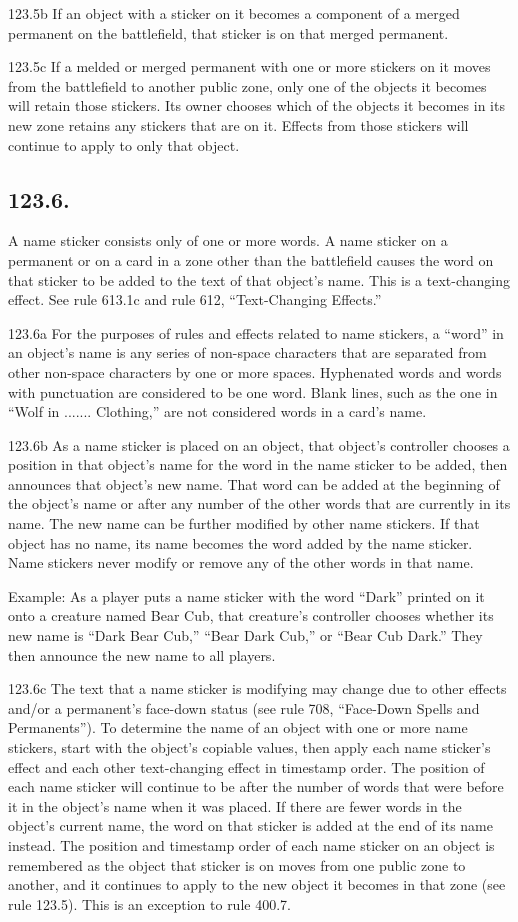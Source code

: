 123.5b If an object with a sticker on it becomes a component of a merged permanent on the battlefield, that sticker is on that merged permanent.

123.5c If a melded or merged permanent with one or more stickers on it moves from the battlefield to another public zone, only one of the objects it becomes will retain those stickers. Its owner chooses which of the objects it becomes in its new zone retains any stickers that are on it. Effects from those stickers will continue to apply to only that object.

\subsection*{123.6.}
A name sticker consists only of one or more words. A name sticker on a permanent or on a card in a zone other than the battlefield causes the word on that sticker to be added to the text of that object’s name. This is a text-changing effect. See rule 613.1c and rule 612, “Text-Changing Effects.”

123.6a For the purposes of rules and effects related to name stickers, a “word” in an object’s name is any series of non-space characters that are separated from other non-space characters by one or more spaces. Hyphenated words and words with punctuation are considered to be one word. Blank lines, such as the one in “Wolf in ....... Clothing,” are not considered words in a card’s name.

123.6b As a name sticker is placed on an object, that object’s controller chooses a position in that object’s name for the word in the name sticker to be added, then announces that object’s new name. That word can be added at the beginning of the object’s name or after any number of the other words that are currently in its name. The new name can be further modified by other name stickers. If that object has no name, its name becomes the word added by the name sticker. Name stickers never modify or remove any of the other words in that name.

Example: As a player puts a name sticker with the word “Dark” printed on it onto a creature named Bear Cub, that creature’s controller chooses whether its new name is “Dark Bear Cub,” “Bear Dark Cub,” or “Bear Cub Dark.” They then announce the new name to all players.

123.6c The text that a name sticker is modifying may change due to other effects and/or a permanent’s face-down status (see rule 708, “Face-Down Spells and Permanents”). To determine the name of an object with one or more name stickers, start with the object’s copiable values, then apply each name sticker’s effect and each other text-changing effect in timestamp order. The position of each name sticker will continue to be after the number of words that were before it in the object’s name when it was placed. If there are fewer words in the object’s current name, the word on that sticker is added at the end of its name instead. The position and timestamp order of each name sticker on an object is remembered as the object that sticker is on moves from one public zone to another, and it continues to apply to the new object it becomes in that zone (see rule 123.5). This is an exception to rule 400.7.

